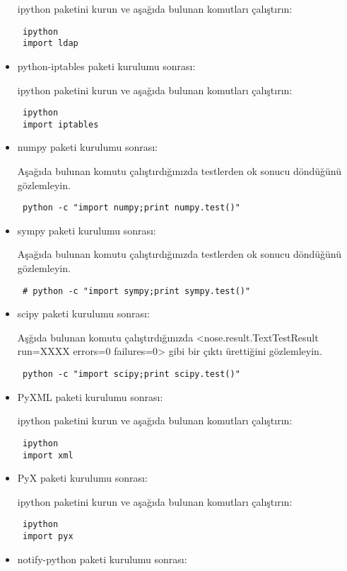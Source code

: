 \documentclass[a4paper,10pt]{article}
\begin{document}
\begin{itemize}
ipython paketini kurun ve aşağıda bulunan komutları çalıştırın:
\begin{verbatim}
 ipython
 import ldap
\end{verbatim}

\item python-iptables paketi kurulumu sonrası:

ipython paketini kurun ve aşağıda bulunan komutları çalıştırın:
\begin{verbatim}
 ipython
 import iptables
\end{verbatim}

\item numpy paketi kurulumu sonrası:

Aşağıda bulunan komutu çalıştırdığınızda testlerden ok sonucu döndüğünü gözlemleyin.
\begin{verbatim}
 python -c "import numpy;print numpy.test()"
\end{verbatim}

\item sympy paketi kurulumu sonrası:

Aşağıda bulunan komutu çalıştırdığınızda testlerden ok sonucu döndüğünü gözlemleyin.
\begin{verbatim}
 # python -c "import sympy;print sympy.test()"
\end{verbatim}

\item scipy paketi kurulumu sonrası:

Aşğıda bulunan komutu çalıştırdığınızda <nose.result.TextTestResult run=XXXX errors=0 failures=0> gibi bir çıktı ürettiğini gözlemleyin.
\begin{verbatim}
 python -c "import scipy;print scipy.test()"
\end{verbatim}

\item PyXML paketi kurulumu sonrası:

ipython paketini kurun ve aşağıda bulunan komutları çalıştırın:
\begin{verbatim}
 ipython
 import xml
\end{verbatim}


\item PyX paketi kurulumu sonrası:

ipython paketini kurun ve aşağıda bulunan komutları çalıştırın:
\begin{verbatim}
 ipython
 import pyx
\end{verbatim}

\item notify-python paketi kurulumu sonrası:


\end{itemize}
\end{document}
